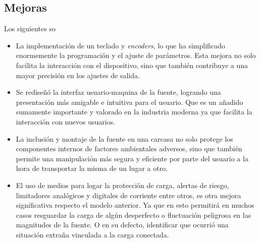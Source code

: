 \subsection{Mejoras} 
Los siguientes so 
\begin{itemize}
    \item La implementación de un teclado y \textit{encoders}, lo que ha simplificado enormemente la programación y el ajuste de parámetros. Esta mejora no solo facilita la interacción con el dispositivo, sino que también contribuye a una mayor precisión en los ajustes de salida. \par
    \item Se rediseñó la interfaz usuario-maquina de la fuente, logrando una presentación más amigable e intuitiva para el usuario. Que es un añadido sumamente importante y valorado en la industria moderna ya que facilita la interacción con nuevos usuarios. \par 
    \item La inclusión y montaje de la fuente en una carcasa no solo protege los componentes internos de factores ambientales adversos, sino que también permite una manipulación más segura y eficiente por parte del usuario a la hora de transportar la misma de un lugar a otro.\par
    \item El uso de medios para logar la protección de carga, alertas de riesgo, limitadores analógicos y digitales de corriente entre otros, es otra mejora significativa respecto el modelo anterior. Ya que en esto permitirá en muchos casos resguardar la carga de algún desperfecto o fluctuación peligrosa en las magnitudes de la fuente. O en su defecto, identificar que ocurrió una situación extraña vinculada a la carga conectada.   
\end{itemize}

